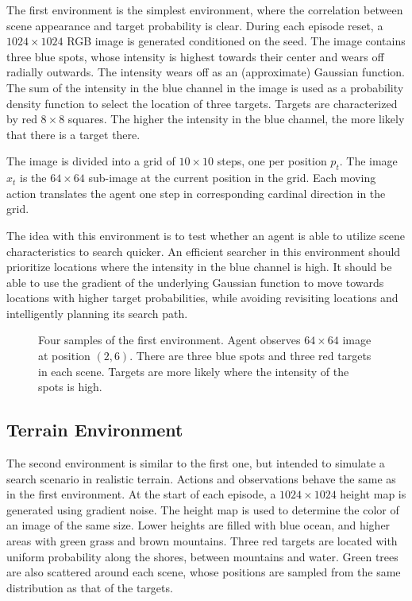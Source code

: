 The first environment is the simplest environment, where the correlation between scene appearance and target probability is clear.
During each episode reset, a \(1024 \times 1024\) RGB image is generated conditioned on the seed.
The image contains three blue spots, whose intensity is highest towards their center and wears off radially outwards.
The intensity wears off as an (approximate) Gaussian function.
The sum of the intensity in the blue channel in the image is used as a probability density function to select the location of three targets.
Targets are characterized by red \(8 \times 8\) squares.
The higher the intensity in the blue channel, the more likely that there is a target there.

The image is divided into a grid of \(10 \times 10\) steps, one per position \(p_t\).
The image \(x_t\) is the \(64 \times 64\) sub-image at the current position in the grid.
Each moving action translates the agent one step in corresponding cardinal direction in the grid.

The idea with this environment is to test whether an agent is able to utilize scene characteristics to search quicker.
An efficient searcher in this environment should prioritize locations where the intensity in the blue channel is high.
It should be able to use the gradient of the underlying Gaussian function to move towards locations with higher target probabilities, while avoiding revisiting locations and intelligently planning its search path.

\begin{figure}
    \centering
    
    \label{fig:gaussian}
    \caption[Gaussian environment]{Four samples of the first environment. Agent observes \(64 \times 64\) image at position \((2, 6)\). There are three blue spots and three red targets in each scene. Targets are more likely where the intensity of the spots is high.}
\end{figure}

\subsection{Terrain Environment}

The second environment is similar to the first one, but intended to simulate a search scenario in realistic terrain.
Actions and observations behave the same as in the first environment.
At the start of each episode, a \(1024 \times 1024\) height map is generated using gradient noise.
The height map is used to determine the color of an image of the same size.
Lower heights are filled with blue ocean, and higher areas with green grass and brown mountains.
Three red targets are located with uniform probability along the shores, between mountains and water.
Green trees are also scattered around each scene, whose positions are sampled from the same distribution as that of the targets.

